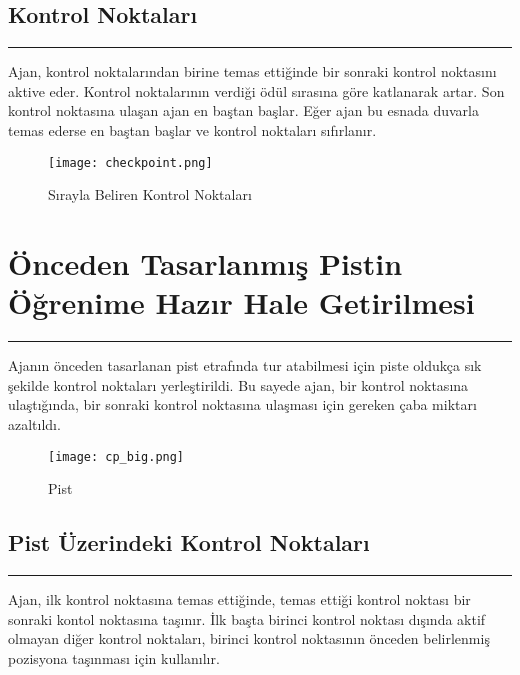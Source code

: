 \documentclass{article}
\begin{document}
\newpage

\subsection{Kontrol Noktaları}
\rule{\textwidth}{0.5pt}
\par Ajan, kontrol noktalarından birine temas ettiğinde bir sonraki kontrol noktasını aktive eder. Kontrol noktalarının verdiği ödül sırasına göre katlanarak artar. Son kontrol noktasına ulaşan ajan en baştan başlar. Eğer ajan bu esnada duvarla temas ederse en baştan başlar ve kontrol noktaları sıfırlanır. \\[5pt]

\begin{figure}[h]
    \begin{center}
        \texttt{[image: checkpoint.png]}
    \end{center}
      \caption{Sırayla Beliren Kontrol Noktaları}
\end{figure}

\newpage 

\section{Önceden Tasarlanmış Pistin Öğrenime Hazır Hale Getirilmesi}
\rule{\textwidth}{0.5pt}
\par Ajanın önceden tasarlanan pist etrafında tur atabilmesi için piste oldukça sık şekilde kontrol noktaları yerleştirildi. Bu sayede ajan, bir kontrol noktasına ulaştığında, bir sonraki kontrol noktasına ulaşması için gereken çaba miktarı azaltıldı. \\[5pt]

\begin{figure}[h]
    \begin{center}
        \texttt{[image: cp\_big.png]}
    \end{center}
      \caption{Pist}
\end{figure}

\newpage

\subsection{Pist Üzerindeki Kontrol Noktaları}
\rule{\textwidth}{0.5pt}
\par Ajan, ilk kontrol noktasına temas ettiğinde, temas ettiği kontrol noktası bir sonraki kontol noktasına taşınır. İlk başta birinci kontrol noktası dışında aktif olmayan diğer kontrol noktaları, birinci kontrol noktasının önceden belirlenmiş pozisyona taşınması için kullanılır\cite{CP}.  \\[5pt]
\end{document}
